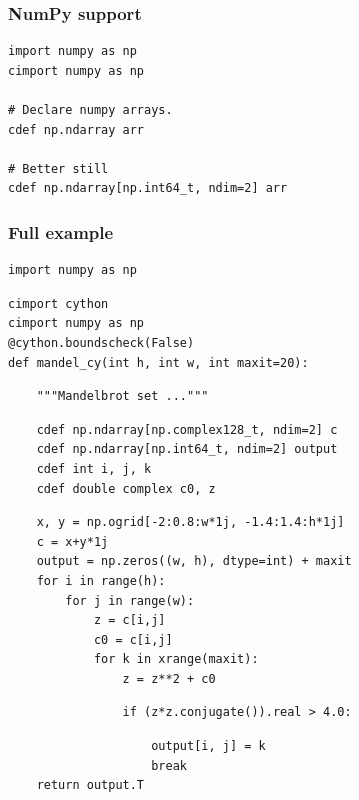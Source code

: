 \documentclass[14pt,compress]{beamer}
\begin{document}
\begin{frame}[fragile]
    \frametitle{NumPy support}
\begin{lstlisting}
import numpy as np
cimport numpy as np

# Declare numpy arrays.
cdef np.ndarray arr

# Better still
cdef np.ndarray[np.int64_t, ndim=2] arr

\end{lstlisting}

\end{frame}

\begin{frame}
    \frametitle{Full example}
    \small
\begin{lstlisting}
import numpy as np
\end{lstlisting}
\begin{lstlisting}
cimport cython
cimport numpy as np
@cython.boundscheck(False)
def mandel_cy(int h, int w, int maxit=20):
\end{lstlisting}
\vspace*{-1em}
\begin{lstlisting}
    """Mandelbrot set ..."""
\end{lstlisting}
\vspace*{-1em}
\begin{lstlisting}
    cdef np.ndarray[np.complex128_t, ndim=2] c
    cdef np.ndarray[np.int64_t, ndim=2] output
    cdef int i, j, k
    cdef double complex c0, z
\end{lstlisting}
\begin{lstlisting}
    x, y = np.ogrid[-2:0.8:w*1j, -1.4:1.4:h*1j]
    c = x+y*1j
    output = np.zeros((w, h), dtype=int) + maxit
    for i in range(h):
        for j in range(w):
            z = c[i,j]
            c0 = c[i,j]
            for k in xrange(maxit):
                z = z**2 + c0
\end{lstlisting}
\vspace*{-1em}
\begin{lstlisting}
                if (z*z.conjugate()).real > 4.0:
\end{lstlisting}
\vspace*{-1em}
\begin{lstlisting}
                    output[i, j] = k
                    break
    return output.T
\end{lstlisting}
\end{frame}
\end{document}
